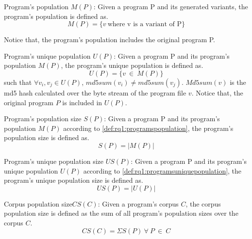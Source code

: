 \begin{definition}{Program's population $M(P)$:}\label{def:rq1:programspopulation}
    Given a program P and its generated variants, the program's population is defined as.\\
    $$
        M(P)=\{v\ \text{where v is a variant of P}\}
    $$

    Notice that, the program's population includes the original program P.
\end{definition}


\begin{definition}{Program's unique population $U(P)$:}\label{def:rq1:programsuniquepopulation}
    Given a program P and its program's population $M(P)$, the program's unique population is defined as.\\
    $$
        U(P)=\{v\ \in\ M(P)\}
    $$
    such that $\forall v_i,v_j \in U(P)$, $md5sum(v_i) \neq md5sum(v_j)$.
    $Md5sum(v)$ is the md5 hash calculated over the byte stream of the program file $v$. Notice that, the original program $P$ is included in $U(P)$.

\end{definition}

\begin{metric}{Program's population size $S(P)$:}\label{metric:rq1:PS}
    Given a program P and its program's population $M(P)$ according to \autoref{def:rq1:programspopulation}, the program's population size is defined as.\\
    $$
        S(P)=|M(P)|
    $$
\end{metric}


\begin{metric}{Program's unique population size $US(P)$:}\label{metric:rq1:UP}
    Given a program P and its program's unique population $U(P)$ according to \autoref{def:rq1:programsuniquepopulation}, the program's unique population size is defined as.\\
    $$
        US(P)=|U(P)|
    $$
\end{metric}

\newcommand{\corpuspopulationsizename}{Corpus population size\xspace}
\newcommand{\corpusuniquepopulationsizename}{Corpus unique population size\xspace}

\begin{metric}{\corpuspopulationsizename$CS(C)$:}\label{metric:rq1:corpus_pop}
    Given a program's corpus $C$, the corpus population size is defined as the sum of all program's population sizes over the corpus $C$.\\
    $$
        CS(C)=\Sigma{S(P)}\ \forall\ P\ \in\ C
    $$
\end{metric}

